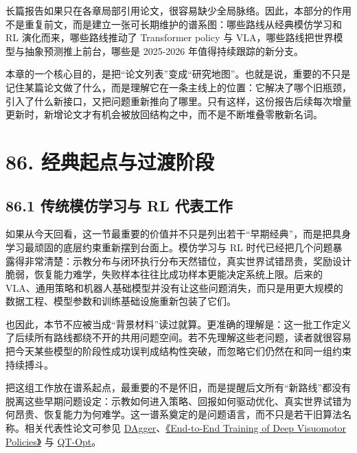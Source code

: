 

长篇报告如果只在各章局部引用论文，很容易缺少全局脉络。因此，本部分的作用不是重复前文，而是建立一张可长期维护的谱系图：哪些路线从经典模仿学习和 RL 演化而来，哪些路线推动了 Transformer policy 与 VLA，哪些路线把世界模型与抽象预测推上前台，哪些是 2025-2026 年值得持续跟踪的新分支。

本章的一个核心目的，是把“论文列表”变成“研究地图”。也就是说，重要的不只是记住某篇论文做了什么，而是理解它在一条主线上的位置：它解决了哪个旧瓶颈，引入了什么新接口，又把问题重新推向了哪里。只有这样，这份报告后续每次增量更新时，新增论文才有机会被放回结构之中，而不是不断堆叠零散新名词。

\section*{86. 经典起点与过渡阶段}

\subsection*{86.1 传统模仿学习与 RL 代表工作}


如果从今天回看，这一节最重要的价值并不只是列出若干“早期经典”，而是把具身学习最顽固的底层约束重新摆到台面上。模仿学习与 RL 时代已经把几个问题暴露得非常清楚：示教分布与闭环执行分布天然错位，真实世界试错昂贵，奖励设计脆弱，恢复能力难学，失败样本往往比成功样本更能决定系统上限。后来的 VLA、通用策略和机器人基础模型并没有让这些问题消失，而只是用更大规模的数据工程、模型参数和训练基础设施重新包装了它们。

也因此，本节不应被当成“背景材料”读过就算。更准确的理解是：这一批工作定义了后续所有路线都绕不开的共用问题空间。若不先理解这些老问题，读者就很容易把今天某些模型的阶段性成功误判成结构性突破，而忽略它们仍然在和同一组约束持续搏斗。

把这组工作放在谱系起点，最重要的不是怀旧，而是提醒后文所有“新路线”都没有脱离这些早期问题设定：示教如何进入策略、回报如何驱动优化、真实世界试错为何昂贵、恢复能力为何难学。这一谱系奠定的是问题语言，而不只是若干旧算法名称。相关代表性论文可参见 \href{https://proceedings.mlr.press/v15/ross11a.html}{DAgger}、\href{https://arxiv.org/abs/1504.00702}{《End-to-End Training of Deep Visuomotor Policies》} 与 \href{https://arxiv.org/abs/1806.10293}{QT-Opt}。

